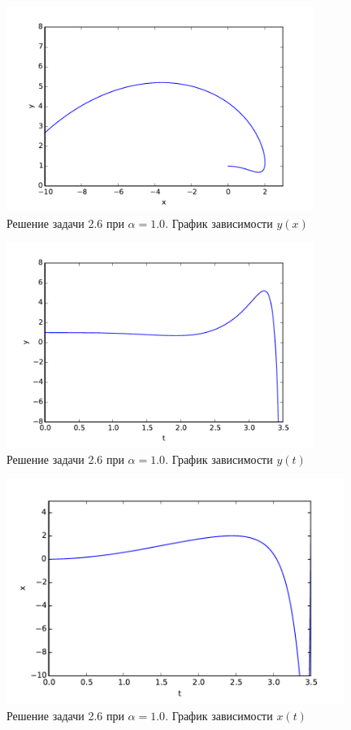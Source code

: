 \documentclass[a4paper,14pt]{article}
\begin{document}
\begin{enumerate}
\begin{figure}[H]
\centering
    \includegraphics[width=100mm]{pictures/10x-y.pdf}
    \caption{Решение задачи 2.6 при $\alpha = 1.0$. График зависимости $y(x)$}
    \label{myx-y}
\end{figure}
\end{enumerate}

\begin{figure}[H]
\centering
    \includegraphics[width=100mm]{pictures/10t-y.pdf}
    \caption{Решение задачи 2.6 при $\alpha = 1.0$. График зависимости $y(t)$}
    \label{myt-y} 
\end{figure}
\begin{figure}[H]
\centering
    \includegraphics[width=110mm]{pictures/10t-x.pdf}
    \caption{Решение задачи 2.6 при $\alpha = 1.0$. График зависимости $x(t)$}
    \label{myt-x}
\end{figure}
\end{document}
